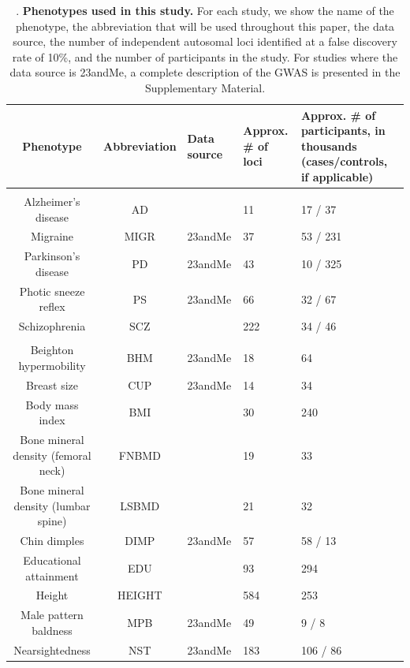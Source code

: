 \documentclass[11pt,titlepage]{article}
\begin{document}
\begin{table}[htp]
\caption{. \textbf{Phenotypes used in this study.} For each study, we show the name of the phenotype, the abbreviation that will be used throughout this paper, the data source, the number of independent autosomal loci identified at a false discovery rate of 10\%, and the number of participants in the study. For studies where the data source is 23andMe, a complete description of the GWAS is presented in the Supplementary Material.}
\begin{center}
\footnotesize{
\begin{tabular}{|c|c| C{3.5cm}| C{2cm}| C{3cm}| }
\hline
Phenotype & Abbreviation & Data source & Approx. \# of loci & Approx. \# of participants, in thousands (cases/controls, if applicable)\\
\hline
{} \\
\hline
Alzheimer's disease & AD & \citep{Lambert:2013aa} & 11 & 17 / 37\\ 
Migraine & MIGR& 23andMe&37 & 53 / 231 \\ 
Parkinson's disease & PD & 23andMe& 43 & 10 / 325 \\ 
Photic sneeze reflex & PS & 23andMe & 66 & 32 / 67\\ 
Schizophrenia & SCZ & \citep{Schizophrenia-Working-Group-of-the-Psychiatric-Genomics-Consortium:2014aa} & 222 & 34  / 46 \\ 
\hline
{} \\
\hline
Beighton hypermobility & BHM & 23andMe & 18 & 64\\ 
Breast size & CUP & 23andMe&14 & 34 \\
Body mass index & BMI & \citep{Locke:2015aa}  & 30 & 240 \\
Bone mineral density (femoral neck) & FNBMD & \citep{Estrada:2012aa} & 19 & 33\\ 
Bone mineral density (lumbar spine) & LSBMD & \citep{Estrada:2012aa} & 21 & 32\\
Chin dimples & DIMP & 23andMe&57 & 58 / 13\\ 
Educational attainment & EDU& \citep{okbay} & 93 & 294 \\
Height & HEIGHT & \citep{Wood:2014aa} & 584 & 253 \\ 
Male pattern baldness &MPB& 23andMe&49 & 9 / 8 \\ 
Nearsightedness & NST & 23andMe&183 & 106 / 86\\ 

\end{tabular}}
\end{center}
\end{table}
\end{document}
